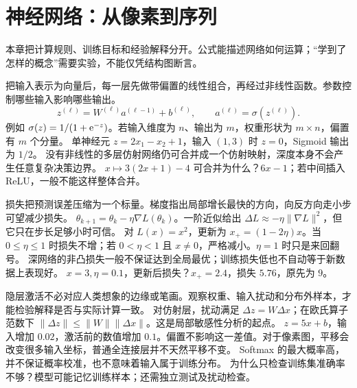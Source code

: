 \chapter{神经网络：从像素到序列}
本章把计算规则、训练目标和经验解释分开。公式能描述网络如何运算；“学到了怎样的概念”需要实验，不能仅凭结构图断言。

\idea 把输入表示为向量后，每一层先做带偏置的线性组合，再经过非线性函数。参数控制哪些输入影响哪些输出。
\mathpart
\[z^{(\ell)}=W^{(\ell)}a^{(\ell-1)}+b^{(\ell)},\qquad
a^{(\ell)}=\sigma(z^{(\ell)}).\]
例如 $\sigma(z)=1/(1+\mathrm e^{-z})$。若输入维度为 $n$、输出为 $m$，权重形状为 $m\times n$，偏置有 $m$ 个分量。
\examplepart 单神经元 $z=2x_1-x_2+1$，输入 $(1,3)$ 时 $z=0$，Sigmoid 输出为 $1/2$。
\pitfall 没有非线性的多层仿射网络仍可合并成一个仿射映射，深度本身不会产生任意复杂决策边界。
\exercise $x\mapsto3(2x+1)-4$ 可合并为什么？$6x-1$；若中间插入 ReLU，一般不能这样整体合并。
\nextlesson

\idea 损失把预测误差压缩为一个标量。梯度指出局部增长最快的方向，向反方向走小步可望减少损失。
\mathpart $\theta_{k+1}=\theta_k-\eta\nabla L(\theta_k)$。一阶近似给出 $\Delta L\approx-\eta\|\nabla L\|^2$，但它只在步长足够小时可信。
\examplepart 对 $L(x)=x^2$，更新为 $x_{+}=(1-2\eta)x$。当 $0\le\eta\le1$ 时损失不增；若 $0<\eta<1$ 且 $x\ne0$，严格减小。$\eta=1$ 时只是来回翻号。
\pitfall 深网络的非凸损失一般不保证达到全局最优；训练损失低也不自动等于新数据上表现好。
\exercise $x=3,\eta=0.1$，更新后损失？$x_+=2.4$，损失 $5.76$，原先为 $9$。
\nextlesson

\idea 隐层激活不必对应人类想象的边缘或笔画。观察权重、输入扰动和分布外样本，才能检验解释是否与实际计算一致。
\mathpart 对仿射层，扰动满足 $\Delta z=W\Delta x$；在欧氏算子范数下 $\|\Delta z\|\le\|W\|\|\Delta x\|$。这是局部敏感性分析的起点。
\examplepart $z=5x+b$，输入增加 $0.02$，激活前的数值增加 $0.1$。偏置不影响这一差值。对于像素图，平移会改变很多输入坐标，普通全连接层并不天然平移不变。
\pitfall Softmax 的最大概率高，并不保证概率校准，也不意味着输入属于训练分布。
\exercise 为什么只检查训练集准确率不够？模型可能记忆训练样本；还需独立测试及扰动检查。
\nextlesson


